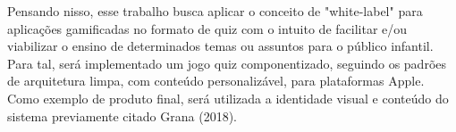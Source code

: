Pensando nisso, esse trabalho busca aplicar o conceito de "white-label" para aplicações gamificadas no formato de quiz com o intuito de facilitar e/ou viabilizar o ensino de determinados temas ou assuntos para o público infantil. Para tal, será implementado um jogo quiz componentizado, seguindo os padrões de arquitetura limpa, com conteúdo personalizável, para plataformas Apple. Como exemplo de produto final, será utilizada a identidade visual e conteúdo do sistema previamente citado Grana (2018).